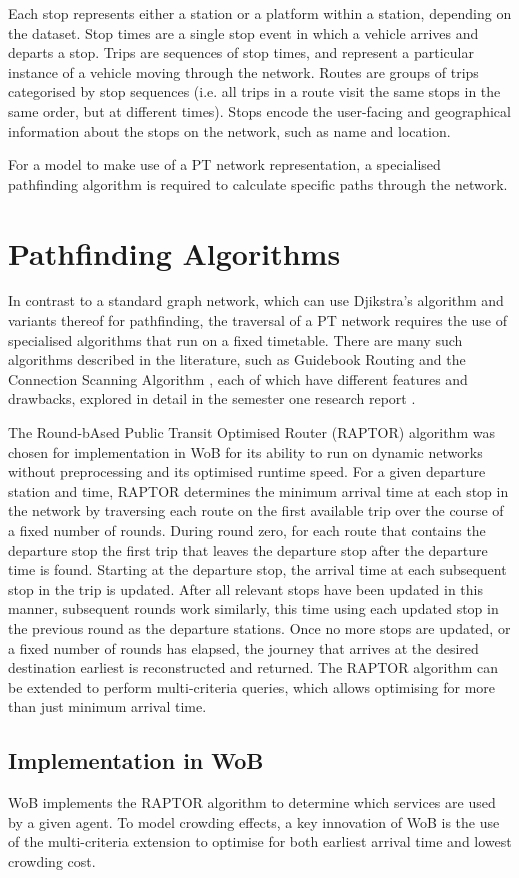 Each stop represents either a station or a platform within a station, depending on the dataset. Stop times are a single stop event in which a vehicle arrives and departs a stop. Trips are sequences of stop times, and represent a particular instance of a vehicle moving through the network. Routes are groups of trips categorised by stop sequences (i.e. all trips in a route visit the same stops in the same order, but at different times). Stops encode the user-facing and geographical information about the stops on the network, such as name and location.

For a model to make use of a PT network representation, a specialised pathfinding algorithm is required to calculate specific paths through the network.

\section{Pathfinding Algorithms}
\label{sec:pathfindingalgorithms}
In contrast to a standard graph network, which can use Djikstra's algorithm and variants thereof for pathfinding, the traversal of a PT network requires the use of specialised algorithms that run on a fixed timetable. There are many such algorithms described in the literature, such as Guidebook Routing \cite{bastFlowBasedGuidebookRouting2014} and the Connection Scanning Algorithm \cite{dibbeltIntriguinglySimpleFast2013}, each of which have different features and drawbacks, explored in detail in the semester one research report \cite{benjaminsutherlandSimulatingMelbournesMetropolitan2024}. 

The Round-bAsed Public Transit Optimised Router (RAPTOR) algorithm was chosen for implementation in WoB \cite{dellingRoundBasedPublicTransit2012} for its ability to run on dynamic networks without preprocessing and its optimised runtime speed. For a given departure station and time, RAPTOR determines the minimum arrival time at each stop in the network by traversing each route on the first available trip over the course of a fixed number of rounds. During round zero, for each route that contains the departure stop the first trip that leaves the departure stop after the departure time is found. Starting at the departure stop, the arrival time at each subsequent stop in the trip is updated. After all relevant stops have been updated in this manner, subsequent rounds work similarly, this time using each updated stop in the previous round as the departure stations. Once no more stops are updated, or a fixed number of rounds has elapsed, the journey that arrives at the desired destination earliest is reconstructed and returned. The RAPTOR algorithm can be extended to perform multi-criteria queries, which allows optimising for more than just minimum arrival time. 

\subsection{Implementation in WoB}
WoB implements the RAPTOR algorithm to determine which services are used by a given agent. To model crowding effects, a key innovation of WoB is the use of the multi-criteria extension to optimise for both earliest arrival time and lowest crowding cost. 
